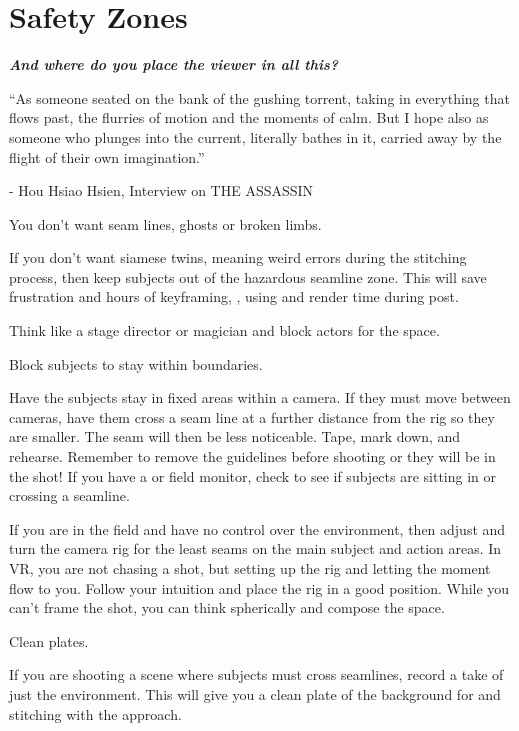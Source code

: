 \chapter{Safety Zones}
\pagecolor{white}
\label{chap:23}
\begin{fullwidth}


{\itshape\bfseries And where do you place the viewer in all this?

“As someone seated on the bank of the gushing torrent, taking in everything that flows past, the flurries of motion and the moments of calm. But I hope also as someone who plunges into the current, literally bathes in it, carried away by the flight of their own imagination.”}

- Hou Hsiao Hsien, Interview on THE ASSASSIN
\vspace{\baselineskip}

\problem

{\large You don’t want seam lines, ghosts or broken limbs. \par}

If you don’t want siamese twins, meaning weird errors during the stitching process, then keep subjects out of the hazardous seamline zone. This will save frustration and hours of keyframing, \textbf{}, using \textbf{} and render time during post. 

Think like a stage director or magician and block actors for the space. 


\solution

{\large Block subjects to stay within boundaries. \par}

Have the subjects stay in fixed areas within a camera. If they must move between cameras, have them cross a seam line at a further distance from the rig so they are smaller. The seam will then be less noticeable. Tape, mark down, and rehearse. Remember to remove the guidelines before shooting or they will be in the shot! If you have a \textbf{} or field monitor, check to see if subjects are sitting in or crossing a seamline. 
\clearpage
{}

If you are in the field and have no control over the environment, then adjust and turn the camera rig for the least seams on the main subject and action areas. In VR, you are not chasing a shot, but setting up the rig and letting the moment flow to you. Follow your intuition and place the rig in a good position. While you can’t frame the shot, you can think spherically and compose the space. 

{\large Clean plates. \par}

If you are shooting a scene where subjects must cross seamlines, record a take of just the environment. This will give you a clean plate of the background for \textbf{} and stitching with the \textbf{} approach. 


\clearpage
\end{fullwidth}
